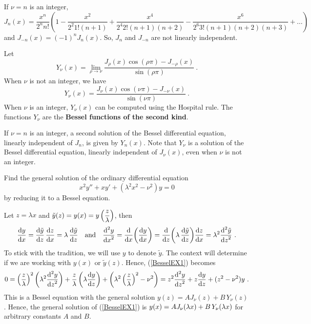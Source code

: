 If $\nu = n$ is an integer,
\[
J_n(x)
= \frac{x^n}{2^n n!} \left( 1 - \frac{x^2}{2^2 1! (n+1)} +
\frac{x^4}{2^4 2! (n+1)(n+2)} - \frac{x^6}{2^6 3! (n+1)(n+2)(n+3)} +
\dots \right)
\]
and $J_{-n}(x) = (-1)^n J_n(x)$.  So, $J_n$ and $J_{-n}$ are not
linearly independent.

Let
\[
Y_\nu(x) = \lim_{\rho \rightarrow \nu}
\frac{J_{\rho}(x) \cos(\rho \pi) - J_{-\rho}(x)}{\sin(\rho \pi)} \  .
\]
When $\nu$ is not an integer, we have
\[
Y_\nu(x) = \frac{J_{\nu}(x) \cos(\nu \pi) - J_{-\nu}(x)}{\sin(\nu \pi)} \  .
\]
When $\nu$ is an integer, $Y_\nu(x)$ can be computed using the
Hospital rule.  The functions $Y_\nu$ are the {\bfseries Bessel
functions of the second kind}.

If $\nu = n$ is an integer, a second solution of the Bessel
differential equation, linearly independent of $J_n$, is given 
by $Y_n(x)$.  Note that $Y_\nu$ is a solution of the Bessel
differential equation, linearly independent of $J_\nu(x)$, even when
$\nu$ is not an integer.

\begin{egg}
Find the general solution of the ordinary differential equation
\begin{equation}\label{BesselEX1}
x^2 y'' + xy' + (\lambda^2 x^2 - \nu^2)y = 0
\end{equation}
by reducing it to a Bessel equation.

Let $z=\lambda x$ and
$\DS \tilde{y}(z) = y(x) = y\left(\frac{z}{\lambda}\right)$,
then
\[
\dydx{y}{x} = \dydx{\tilde{y}}{z}\,\dydx{z}{x}
= \lambda\, \dydx{\tilde{y}}{z} \quad \text{and} \quad
\dydxn{y}{x}{2} = \dfdx{\left( \dydx{y}{x} \right)}{x}
= \dfdx{\left( \lambda\,\dydx{\tilde{y}}{z} \right)}{z} \dydx{z}{x}
= \lambda^2 \dydxn{\tilde{y}}{z}{2} \ .
\]
To stick with the tradition, we will use $y$ to denote $\tilde{y}$.
The context will determine if we are working with $y(x)$ or
$\tilde{y}(z)$.  Hence, (\ref{BesselEX1}) becomes
\[
0 = \left(\frac{z}{\lambda}\right)^2 \left( \lambda^2 \dydxn{y}{z}{2}\right)
+ \frac{z}{\lambda} \left(\lambda \dydx{y}{z}\right)
+\left( \lambda^2 \left(\frac{z}{\lambda}\right)^2 - \nu^2\right)
= z^2 \dydxn{y}{z}{2} + z \dydx{y}{z} + (z^2 - \nu^2) y \ .
\]
This is a Bessel equation with the general solution
$y(z) = A J_\nu(z) + B\,Y_\nu(z)$.  Hence,
the general solution of (\ref{BesselEX1}) is
$\DS y(x) = A J_\nu(\lambda x) + B\,Y_\nu(\lambda x)$
for arbitrary constants $A$ and $B$.
\end{egg}

